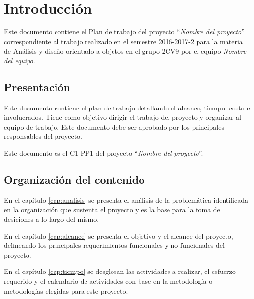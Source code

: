 \chapter{Introducción}


	Este documento contiene el Plan de trabajo del proyecto ``{\em Nombre del proyecto}'' correspondiente al trabajo realizado en el semestre 2016-2017-2 para la materia de Análisis y diseño orientado a objetos en el grupo 2CV9 por el equipo {\em Nombre del equipo}.

\section{Presentación}


	Este documento contiene el plan de trabajo detallando el alcance, tiempo, costo e involucrados. Tiene como objetivo dirigir el trabajo del proyecto y organizar al equipo de trabajo. Este documento debe ser aprobado por los principales responsables del proyecto.
	
	Este documento es el C1-PP1 del proyecto ``{\em Nombre del proyecto}''.
	
\section{Organización del contenido}

	En el capítulo \ref{cap:analisis} se presenta el análisis de la problemática identificada en la organización que sustenta el proyecto y es la base para la toma de desiciones a lo largo del mismo.
	
	En el capítulo \ref{cap:alcance} se presenta el objetivo y el alcance del proyecto, delineando los principales requerimientos funcionales y no funcionales del proyecto.
	
	En el capítulo \ref{cap:tiempo} se desglosan las actividades a realizar, el esfuerzo requerido y el calendario de actividades con base en la metodología o metodologías elegidas para este proyecto.
	
